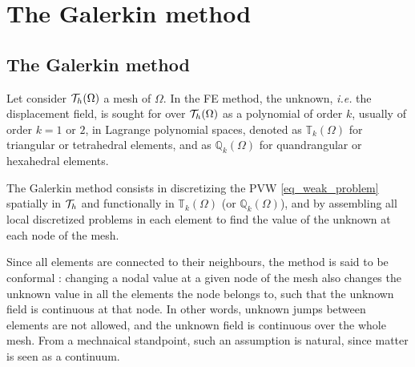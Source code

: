 \documentclass[fleqn]{article}
\begin{document}
  \newpage
  
    \section{The Galerkin method}


        \subsection{The Galerkin method}

            Let consider $\mathcal{T}_h(\Omega)$ a mesh of $\Omega$. In the FE method, the unknown, \textit{i.e.} the displacement field, is sought for over $\mathcal{T}_h(\Omega)$ as a polynomial of order $k$, usually of order $k=1$ or $2$, in Lagrange polynomial spaces, denoted as $\mathbb{T}_k(\Omega)$ for triangular or tetrahedral elements, and as $\mathbb{Q}_k(\Omega)$ for quandrangular or hexahedral elements.
            \par
            The Galerkin method consists in discretizing the PVW \eqref{eq_weak_problem} spatially in $\mathcal{T}_h$ and functionally in $\mathbb{T}_k(\Omega)$ (or $\mathbb{Q}_k(\Omega)$), and by assembling all local discretized problems in each element to find the value of the unknown at each node of the mesh.
            \par
            Since all elements are connected to their neighbours, the method is said to be conformal : changing a nodal value at a given node of the mesh also changes the unknown value in all the elements the node belongs to, such that the unknown field is continuous at that node. In other words, unknown jumps between elements are not allowed, and the unknown field is continuous over the whole mesh. From a mechnaical standpoint, such an assumption is natural, since matter is seen as a continuum.
\end{document}
